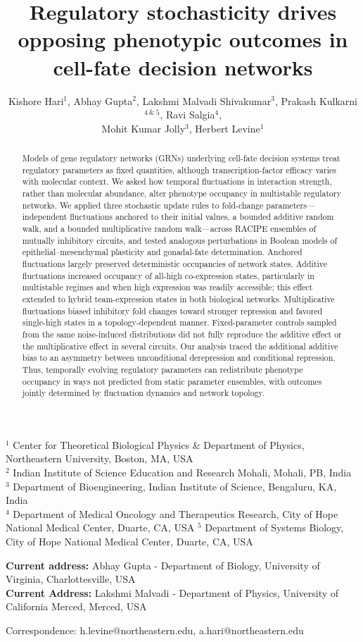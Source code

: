 \documentclass[11pt]{article}
\title{Regulatory stochasticity drives opposing phenotypic outcomes in cell-fate decision networks}
\author{Kishore Hari$^1$, Abhay Gupta$^2$, Lakshmi Malvadi Shivakumar$^3$, Prakash Kulkarni$^{4~\&~5}$, Ravi Salgia$^4$, \\ Mohit Kumar Jolly$^3$, Herbert Levine$^1$}
\begin{document}
\maketitle
\begin{center}
    $^1$ Center for Theoretical Biological Physics \& Department of Physics, Northeastern University, Boston, MA, USA\\
    $^2$ Indian Institute of Science Education and Research Mohali, Mohali, PB, India\\
    $^3$ Department of Bioengineering, Indian Institute of Science, Bengaluru, KA, India \\
    $^4$ Department of Medical Oncology and Therapeutics Research, City of Hope National Medical Center, Duarte, CA, USA
    $^5$ Department of Systems Biology, City of Hope National Medical Center, Duarte, CA, USA 
\end{center}
\begin{center}
    \small \textbf{Current address:} Abhay Gupta - Department of Biology, University of Virginia, Charlottesville, USA\\
    \small \textbf{Current Address:} Lakshmi Malvadi - Department of Physics, University of California Merced, Merced, USA\\
\end{center}
\small Correspondence: h.levine@northeastern.edu, a.hari@northeastern.edu
\begin{abstract}
Models of gene regulatory networks (GRNs) underlying cell-fate decision systems treat regulatory parameters as fixed quantities, although transcription-factor efficacy varies with molecular context. We asked how temporal fluctuations in interaction strength, rather than molecular abundance, alter phenotype occupancy in multistable regulatory networks. We applied three stochastic update rules to fold-change parameters—independent fluctuations anchored to their initial values, a bounded additive random walk, and a bounded multiplicative random walk—across RACIPE ensembles of mutually inhibitory circuits, and tested analogous perturbations in Boolean models of epithelial–mesenchymal plasticity and gonadal-fate determination. Anchored fluctuations largely preserved deterministic occupancies of network states. Additive fluctuations increased occupancy of all-high co-expression states, particularly in multistable regimes and when high expression was readily accessible; this effect extended to hybrid team-expression states in both biological networks. Multiplicative fluctuations biased inhibitory fold changes toward stronger repression and favored single-high states in a topology-dependent manner. Fixed-parameter controls sampled from the same noise-induced distributions did not fully reproduce the additive effect or the multiplicative effect in several circuits. Our analysis traced the additional additive bias to an asymmetry between unconditional derepression and conditional repression. Thus, temporally evolving regulatory parameters can redistribute phenotype occupancy in ways not predicted from static parameter ensembles, with outcomes jointly determined by fluctuation dynamics and network topology.
\end{abstract}
\newpage
\end{document}
